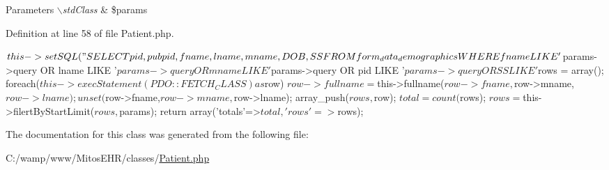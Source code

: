 \begin{DoxyParams}{\-Parameters}
{\em $\backslash$std\-Class} & \$params \\
\hline
\end{DoxyParams}


\-Definition at line 58 of file \-Patient.\-php.


\begin{DoxyCode}
                                                       {
        $this->setSQL("SELECT pid,pubpid,fname,lname,mname,DOB,SS
                             FROM form_data_demographics
                            WHERE fname LIKE '$params->query%
                               OR lname LIKE '$params->query%
                               OR mname LIKE '$params->query%
                               OR pid   LIKE '$params->query%
                               OR SS    LIKE '%
        $rows = array();
        foreach($this->execStatement(PDO::FETCH_CLASS) as $row){
            $row->fullname = $this->fullname($row->fname,$row->mname,$row->
      lname);
            unset($row->fname,$row->mname,$row->lname);
            array_push($rows, $row);
        }
        $total  = count($rows);
        $rows = $this->filertByStartLimit($rows,$params);
        return array('totals'=>$total ,'rows'=>$rows);
    }
\end{DoxyCode}


\-The documentation for this class was generated from the following file\-:\begin{DoxyCompactItemize}
\item 
\-C\-:/wamp/www/\-Mitos\-E\-H\-R/classes/\hyperlink{_patient_8php}{\-Patient.\-php}\end{DoxyCompactItemize}
